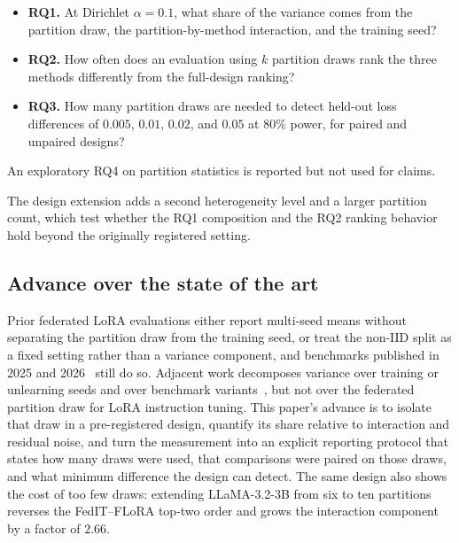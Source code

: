 \begin{itemize}
\item \textbf{RQ1.} At Dirichlet $\alpha{=}0.1$, what share of the variance comes from the partition draw, the partition-by-method interaction, and the training seed?
\item \textbf{RQ2.} How often does an evaluation using $k$ partition draws rank the three methods differently from the full-design ranking?
\item \textbf{RQ3.} How many partition draws are needed to detect held-out loss differences of $0.005$, $0.01$, $0.02$, and $0.05$ at $80\%$ power, for paired and unpaired designs?
\end{itemize}

An exploratory RQ4 on partition statistics is reported but not used for claims.

The design extension adds a second heterogeneity level and a larger partition count, which
test whether the RQ1 composition and the RQ2 ranking behavior hold beyond the originally
registered setting.

\subsection{Advance over the state of the art}
Prior federated LoRA evaluations either report multi-seed means without separating the
partition draw from the training seed, or treat the non-IID split as a fixed setting rather
than a variance component, and benchmarks published in 2025 and
2026~\cite{domini2025profed,jimenez2026crossdomain,grosser2026fedpretrain} still do so.
Adjacent work decomposes variance over training or unlearning seeds and over benchmark
variants~\cite{bouthillier2021accounting,agarwal2021precipice,lanyon2025unlearningseeds,chanin2026saebench},
but not over the federated partition draw for LoRA instruction tuning. This paper's advance is to isolate that draw in a pre-registered design, quantify its share relative to interaction and residual noise, and turn the measurement into an explicit reporting protocol that states how many draws were used, that comparisons were paired on those draws, and what minimum difference the design can detect. The same design also shows the cost of too few draws: extending LLaMA-3.2-3B from six to ten partitions reverses the FedIT--FLoRA top-two order and grows the interaction component by a factor of $2.66$.

